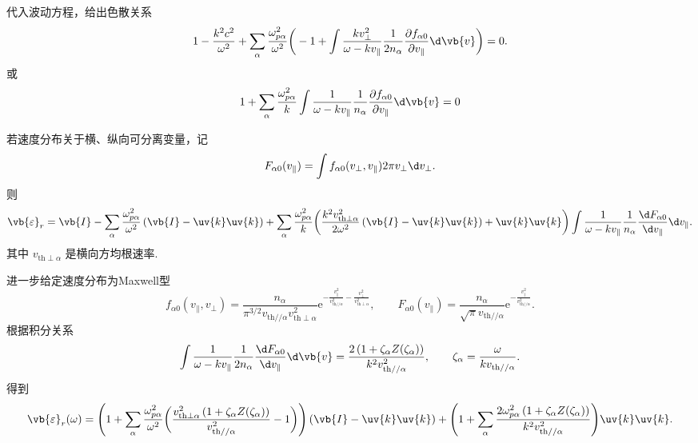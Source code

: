 \begin{example}
	代入波动方程，给出色散关系
	\begin{equation*}
		1 - \frac{k^2c^2}{\omega^2} + \sum_\alpha\frac{\omega_{p\alpha}^2}{\omega^2}\bigg(-1 + \int\frac{k v_\perp^2}{\omega-k v_{\parallel}}\frac{1}{2n_\alpha}\frac{\partial f_{\alpha0}}{\partial v_{\parallel}}\d \vb{v}\bigg) = 0.
	\end{equation*}
	或
	\begin{equation*}
		1 + \sum_\alpha\frac{\omega_{p\alpha}^2}{k}\int\frac{1}{\omega-k v_{\parallel}}\frac{1}{n_\alpha}\frac{\partial f_{\alpha0}}{\partial v_{\parallel}}\d \vb{v} = 0
	\end{equation*}
\end{example}

\begin{example}
	\label{等离子体_横纵可分离变量}

	若速度分布关于横、纵向可分离变量，记
	\begin{equation*}
		F_{\alpha0}(v_{\parallel}) = \int f_{\alpha0}(v_\perp,v_{\parallel})2\pi v_\perp\d v_\perp.
	\end{equation*}
	则
	\begin{equation*}
		\vb{\varepsilon}_r = \vb{I} - \sum_\alpha\frac{\omega_{p\alpha}^2}{\omega^2}\left(\vb{I}-\uv{k}\uv{k}\right) + \sum_\alpha\frac{\omega_{p\alpha}^2}{k}\bigg(\frac{k^2v_{\mathrm{th}\perp\alpha}^2}{2\omega^2}\left(\vb{I}-\uv{k}\uv{k}\right)+\uv{k}\uv{k}\bigg)\int\frac{1}{\omega-k v_{\parallel}}\frac{1}{n_\alpha}\frac{\d F_{\alpha0}}{\d v_{\parallel}}\d v_{\parallel}.
	\end{equation*}
	其中 \(v_{\mathrm{th}\perp\alpha}\) 是横向方均根速率.

	进一步给定速度分布为Maxwell型
	\begin{equation*}
		f_{\alpha0}(v_{\parallel},v_\perp) = \frac{n_\alpha}{\pi^{3/2}v_{\mathrm{th}//\alpha}v_{\mathrm{th}\perp\alpha}^2}\mathrm{e}^{-\frac{v_{\parallel}^2}{v_{\mathrm{th}//\alpha}^2}-\frac{v_\perp^2}{v_{\mathrm{th}\perp\alpha}^2}},\qquad F_{\alpha0}(v_{\parallel}) = \frac{n_\alpha}{\sqrt{\pi}v_{\mathrm{th}//\alpha}}\mathrm{e}^{-\frac{v_{\parallel}^2}{v_{\mathrm{th}//\alpha}^2}}.
	\end{equation*}
	根据积分关系
	\begin{equation*}
		\int\frac{1}{\omega-k v_{\parallel}}\frac{1}{2n_\alpha}\frac{\d F_{\alpha0}}{\d v_{\parallel}}\d \vb{v} = \frac{2\left(1+\zeta_\alpha Z(\zeta_\alpha)\right)}{k^2v_{\mathrm{th}//\alpha}^2},\qquad \zeta_\alpha = \frac{\omega}{k v_{\mathrm{th}//\alpha}}.
	\end{equation*}
	得到
	\begin{equation*}
		\vb{\varepsilon}_r(\omega) = \Bigg(1 + \sum_\alpha\frac{\omega_{p\alpha}^2}{\omega^2}\bigg(\frac{v_{\mathrm{th}\perp\alpha}^2\left(1+\zeta_\alpha Z(\zeta_\alpha)\right)}{v_{\mathrm{th}//\alpha}^2}-1\bigg)\Bigg)\left(\vb{I}-\uv{k}\uv{k}\right) + \Bigg(1 + \sum_\alpha\frac{2\omega_{p\alpha}^2\left(1+\zeta_\alpha Z(\zeta_\alpha)\right)}{k^2v_{\mathrm{th}//\alpha}^2}\Bigg)\uv{k}\uv{k}.
	\end{equation*}


\end{example}
